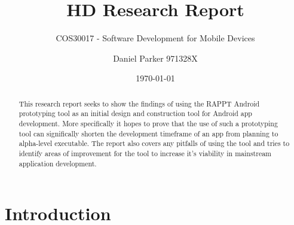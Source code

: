 \documentclass[11pt,english,numbers=endperiod,parskip=half,abstract=on]{scrartcl}
\title{HD Research Report}
\subtitle{COS30017 - Software Development for Mobile Devices}
\author{Daniel Parker 971328X}
\date{\today}
\begin{document}
\maketitle
\begin{abstract}
  This research report seeks to show the findings of using the RAPPT Android
  prototyping tool as an initial design and construction tool for Android app
  development. More specifically it hopes to prove that the use of such a
  prototyping tool can significally shorten the development timeframe of an app
  from planning to alpha-level executable. The report also covers any pitfalls
  of using the tool and tries to identify areas of improvement for the tool to
  increase it's viability in mainstream application development.
\end{abstract}
\thispagestyle{empty}

\section{Introduction}
\end{document}
